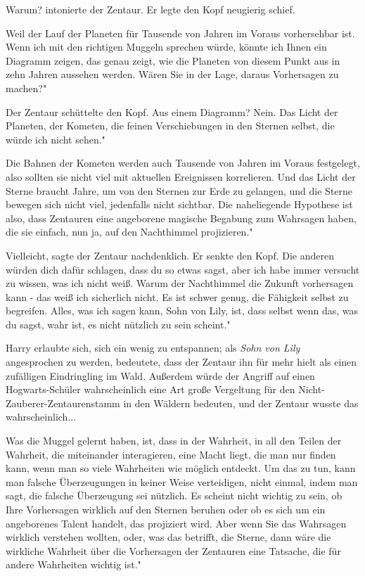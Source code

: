 \glqq{}Warum?\grqq{} intonierte der Zentaur. Er legte den Kopf neugierig schief.

\glqq{}Weil der Lauf der Planeten für Tausende von Jahren im Voraus vorhersehbar
ist. Wenn ich mit den richtigen Muggeln sprechen würde, könnte ich Ihnen ein
Diagramm zeigen, das genau zeigt, wie die Planeten von diesem Punkt aus in zehn
Jahren aussehen werden. Wären Sie in der Lage, daraus Vorhersagen zu machen?"

Der Zentaur schüttelte den Kopf. \glqq{}Aus einem Diagramm? Nein. Das Licht der
Planeten, der Kometen, die feinen Verschiebungen in den Sternen selbst, die
würde ich nicht sehen."

\glqq{}Die Bahnen der Kometen werden auch Tausende von Jahren im Voraus
festgelegt, also sollten sie nicht viel mit aktuellen Ereignissen korrelieren.
Und das Licht der Sterne braucht Jahre, um von den Sternen zur Erde zu gelangen,
und die Sterne bewegen sich nicht viel, jedenfalls nicht sichtbar. Die
naheliegende Hypothese ist also, dass Zentauren eine angeborene magische
Begabung zum Wahrsagen haben, die sie einfach, nun ja, auf den Nachthimmel
projizieren."

\glqq{}Vielleicht\grqq{}, sagte der Zentaur nachdenklich. Er senkte den Kopf.
\glqq{}Die anderen würden dich dafür schlagen, dass du so etwas sagst, aber ich
habe immer versucht zu wissen, was ich nicht weiß. Warum der Nachthimmel die
Zukunft vorhersagen kann - das weiß ich sicherlich nicht. Es ist schwer genug,
die Fähigkeit selbst zu begreifen. Alles, was ich sagen kann, Sohn von Lily,
ist, dass selbst wenn das, was du sagst, wahr ist, es nicht nützlich zu sein
scheint."

Harry erlaubte sich, sich ein wenig zu entspannen; als\emph{ \glqq{}Sohn von
Lily\grqq{}} angesprochen zu werden, bedeutete, dass der Zentaur ihn für mehr
hielt als einen zufälligen Eindringling im Wald. Außerdem würde der Angriff auf
einen Hogwarts-Schüler wahrscheinlich eine Art große Vergeltung für den
Nicht-Zauberer-Zentaurenstamm in den Wäldern bedeuten, und der Zentaur wusste
das wahrscheinlich...

\glqq{}Was die Muggel gelernt haben, ist, dass in der Wahrheit, in all den Teilen
der Wahrheit, die miteinander interagieren, eine Macht liegt, die man nur finden
kann, wenn man so viele Wahrheiten wie möglich entdeckt. Um das zu tun, kann man
falsche Überzeugungen in keiner Weise verteidigen, nicht einmal, indem man sagt,
die falsche Überzeugung sei nützlich. Es scheint nicht wichtig zu sein, ob Ihre
Vorhersagen wirklich auf den Sternen beruhen oder ob es sich um ein angeborenes
Talent handelt, das projiziert wird. Aber wenn Sie das Wahrsagen wirklich
verstehen wollten, oder, was das betrifft, die Sterne, dann wäre die wirkliche
Wahrheit über die Vorhersagen der Zentauren eine Tatsache, die für andere
Wahrheiten wichtig ist."

